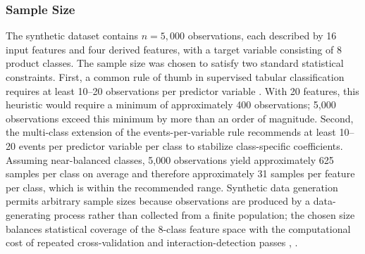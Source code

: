 \documentclass{icsthesis}
\begin{document}
\begin{mainmatter}
				\subsubsection{Sample Size}
					The synthetic dataset contains $n = 5{,}000$ observations, each described by 16 input features and four derived features, with a target variable consisting of 8 product classes. The sample size was chosen to satisfy two standard statistical constraints. First, a common rule of thumb in supervised tabular classification requires at least 10--20 observations per predictor variable \cite{ref52}. With 20 features, this heuristic would require a minimum of approximately 400 observations; 5{,}000 observations exceed this minimum by more than an order of magnitude. Second, the multi-class extension of the events-per-variable rule \cite{ref53} recommends at least 10--20 events per predictor variable per class to stabilize class-specific coefficients. Assuming near-balanced classes, 5{,}000 observations yield approximately 625 samples per class on average and therefore approximately 31 samples per feature per class, which is within the recommended range. Synthetic data generation permits arbitrary sample sizes because observations are produced by a data-generating process rather than collected from a finite population; the chosen size balances statistical coverage of the 8-class feature space with the computational cost of repeated cross-validation and interaction-detection passes \cite{ref52}, \cite{ref83}.


\end{mainmatter}
\end{document}

